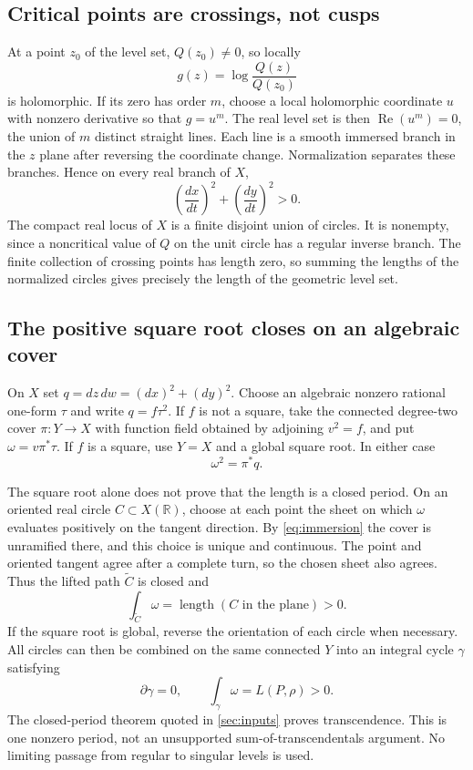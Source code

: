 \documentclass[11pt,a4paper]{article}
\numberwithin{equation}{section}
\theoremstyle{definition}
\theoremstyle{remark}
\newcommand{\R}{\mathbb R}
\newcommand{\length}{\operatorname{length}}
\begin{document}
\subsection{Critical points are crossings, not cusps}
At a point $z_0$ of the level set, $Q(z_0)\ne0$, so locally
\[
 g(z)=\log\frac{Q(z)}{Q(z_0)}
\]
is holomorphic. If its zero has order $m$, choose a local holomorphic
coordinate $u$ with nonzero derivative so that $g=u^m$. The real level set
is then $\operatorname{Re}(u^m)=0$, the union of $m$ distinct straight lines.
Each line is a smooth immersed branch in the $z$ plane after reversing the
coordinate change. Normalization separates these branches. Hence on every
real branch of $X$,
\begin{equation}\label{eq:immersion}
 \left(\frac{dx}{dt}\right)^2+\left(\frac{dy}{dt}\right)^2>0.
\end{equation}
The compact real locus of $X$ is a finite disjoint union of circles. It is
nonempty, since a noncritical value of $Q$ on the unit circle has a regular
inverse branch. The finite collection of crossing points has length zero,
so summing the lengths of the normalized circles gives precisely the length
of the geometric level set.

\subsection{The positive square root closes on an algebraic cover}
On $X$ set $q=dz\,dw=(dx)^2+(dy)^2$. Choose an algebraic nonzero rational
one-form $\tau$ and write $q=f\tau^2$. If $f$ is not a square, take the
connected degree-two cover $\pi:Y\to X$ with function field obtained by
adjoining $v^2=f$, and put $\omega=v\pi^*\tau$. If $f$ is a square, use
$Y=X$ and a global square root. In either case
\begin{equation}\label{eq:sqrt-form}
 \omega^2=\pi^*q.
\end{equation}

The square root alone does not prove that the length is a closed period.
On an oriented real circle $C\subset X(\R)$, choose at each point the sheet
on which $\omega$ evaluates positively on the tangent direction.
By \eqref{eq:immersion} the cover is unramified there, and this choice is
unique and continuous. The point and oriented tangent agree after a complete
turn, so the chosen sheet also agrees. Thus the lifted path $\widetilde C$
is closed and
\[
 \int_{\widetilde C}\omega=\length(C\text{ in the plane})>0.
\]
If the square root is global, reverse the orientation of each circle when
necessary. All circles can then be combined on the same connected $Y$ into
an integral cycle $\gamma$ satisfying
\begin{equation}\label{eq:lem-period}
 \partial\gamma=0,\qquad \int_\gamma\omega=L(P,\rho)>0.
\end{equation}
The closed-period theorem quoted in \cref{sec:inputs} proves transcendence.
This is one nonzero period, not an unsupported sum-of-transcendentals
argument. No limiting passage from regular to singular levels is used.
\end{document}
